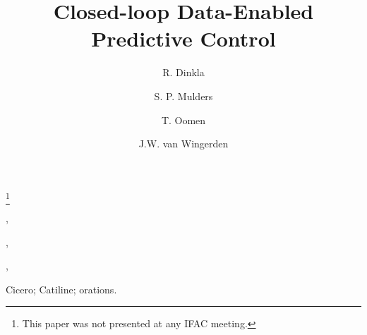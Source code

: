 \documentclass[twocolumn]{autart}    %
\begin{document}
\begin{frontmatter}

\title{Closed-loop Data-Enabled Predictive Control} %

\thanks[footnoteinfo]{This paper was not presented at any IFAC meeting.}

\author[TUD]{R. Dinkla},    %
\author[TUD]{S. P. Mulders},               %
\author[TUD,TUE]{T. Oomen},  %
\author[TUD]{J.W. van Wingerden}
\address[TUD]{Delft Center for Systems and Control, Delft University of Technology, Mekelweg 2, 2628CD Delft, The Netherlands}  %
\address[TUE]{Control Systems Technology Group, Eindhoven University of Technology, 5600
MB Eindhoven, The Netherlands}        %

          
\begin{keyword}                           %
Cicero; Catiline; orations.               %
\end{keyword}                             %



\end{frontmatter}
\end{document}
